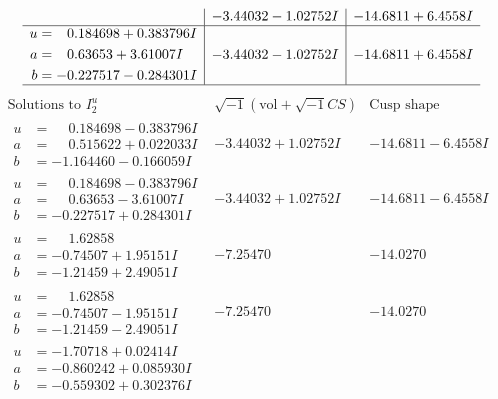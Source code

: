 \documentclass[1p]{elsarticle_modified}
\theoremstyle{definition}
\newcommand{\I}{\sqrt{-1}}
\begin{document}
$$\begin{array}{c|c|c}
 & -3.44032 - 1.02752 I & -14.6811 + 6.4558 I \\ \hline\begin{aligned}
u &= \phantom{-}0.184698 + 0.383796 I \\
a &= \phantom{-}0.63653 + 3.61007 I \\
b &= -0.227517 - 0.284301 I\end{aligned}
 & -3.44032 - 1.02752 I & -14.6811 + 6.4558 I\\
 \hline 
 \end{array}$$\newpage$$\begin{array}{c|c|c}  
\text{Solutions to }I^u_{2}& \I (\text{vol} + \sqrt{-1}CS) & \text{Cusp shape}\\
 \hline 
\begin{aligned}
u &= \phantom{-}0.184698 - 0.383796 I \\
a &= \phantom{-}0.515622 + 0.022033 I \\
b &= -1.164460 - 0.166059 I\end{aligned}
 & -3.44032 + 1.02752 I & -14.6811 - 6.4558 I \\ \hline\begin{aligned}
u &= \phantom{-}0.184698 - 0.383796 I \\
a &= \phantom{-}0.63653 - 3.61007 I \\
b &= -0.227517 + 0.284301 I\end{aligned}
 & -3.44032 + 1.02752 I & -14.6811 - 6.4558 I \\ \hline\begin{aligned}
u &= \phantom{-}1.62858\phantom{ +0.000000I} \\
a &= -0.74507 + 1.95151 I \\
b &= -1.21459 + 2.49051 I\end{aligned}
 & -7.25470\phantom{ +0.000000I} & -14.0270\phantom{ +0.000000I} \\ \hline\begin{aligned}
u &= \phantom{-}1.62858\phantom{ +0.000000I} \\
a &= -0.74507 - 1.95151 I \\
b &= -1.21459 - 2.49051 I\end{aligned}
 & -7.25470\phantom{ +0.000000I} & -14.0270\phantom{ +0.000000I} \\ \hline\begin{aligned}
u &= -1.70718 + 0.02414 I \\
a &= -0.860242 + 0.085930 I \\
b &= -0.559302 + 0.302376 I\end{aligned}

\end{array}$$
\end{document}
